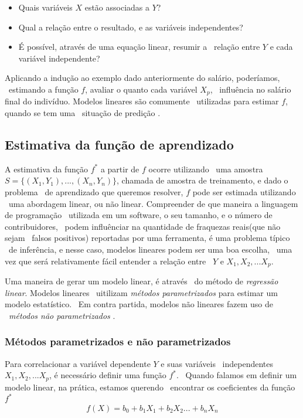 \begin{itemize}
\item Quais variáveis $X$ estão associadas a $Y$?
\item Qual a relação entre o resultado, e as variáveis independentes?
\item É possível, através de uma equação linear, resumir a \
        relação entre $Y$ e cada variável independente?
\end{itemize}

Aplicando a indução ao exemplo dado anteriormente do salário, poderíamos, \
estimando a função $f$, avaliar o quanto cada variável $X_p$, \
influência no salário final do indivíduo. Modelos lineares são comumente \
utilizadas para estimar $f$, quando se tem uma \
situação de predição \cite{Jordan}.

\subsection{Estimativa da função de aprendizado}
A estimativa da função $f^*$ a partir de $f$ ocorre utilizando \
uma amostra $S = \{(X_1, Y_1),...,(X_n, Y_n)\}$,
chamada de amostra de treinamento\cite{Malhotra}, e dado o problema \
de aprendizado que queremos resolver, $f$ pode ser estimada utilizando \
uma abordagem linear, ou não linear.
Compreender de que maneira a linguagem de programação \
utilizada em um software, o seu tamanho, e o número de contribuidores, \
podem influênciar na quantidade de fraquezas reais(que não sejam \
falsos positivos) reportadas por uma ferramenta, é uma problema típico \
de inferência, e nesse caso, modelos lineares podem ser uma boa escolha, \
uma vez que será relativamente fácil entender a relação entre \
$Y$ e $X_1,X_2,...X_p$\cite{Jordan}.

Uma maneira de gerar um modelo linear, é através \
do método de \textit{regressão linear}.  Modelos lineares \
uitilizam \textit{métodos parametrizados} para estimar um modelo estatístico. \
Em contra partida, modelos não lineares fazem uso de \
\textit{métodos não parametrizados} \cite{Jordan}.

\subsubsection{Métodos parametrizados e não parametrizados}

Para correlacionar a variável dependente $Y$ e suas variáveis \
independentes $X_1,X_2,...X_p$, é necessário definir uma função $f^*$. \
Quando falamos em definir um modelo linear, na prática, estamos querendo \
encontrar os coeficientes da função $f^*$
\[
        f(X) = b_0 + b_1X_1 + b_2X_2 ... + b_nX_n
\]


